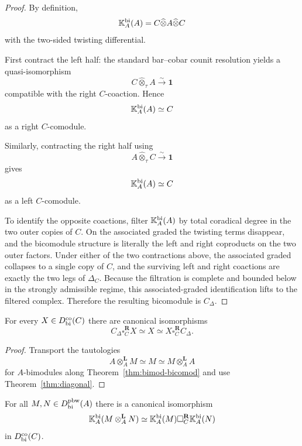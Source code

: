 \begin{proof}
By definition,
\[
\mathbb{K}_A^{\mathrm{bi}}(A)=C\widehat\otimes A\widehat\otimes C
\]
with the two-sided twisting differential.

First contract the left half:
the standard bar--cobar counit resolution yields a quasi-isomorphism
\[
C\widehat\otimes_\tau A\xrightarrow{\sim} \mathbf 1
\]
compatible with the right $C$-coaction. Hence
\[
\mathbb{K}_A^{\mathrm{bi}}(A)\simeq C
\]
as a right $C$-comodule.

Similarly, contracting the right half using
\[
A\widehat\otimes_\tau C\xrightarrow{\sim}\mathbf 1
\]
gives
\[
\mathbb{K}_A^{\mathrm{bi}}(A)\simeq C
\]
as a left $C$-comodule.

To identify the opposite coactions, filter $\mathbb{K}_A^{\mathrm{bi}}(A)$ by total coradical degree in the
two outer copies of $C$. On the associated graded the twisting terms disappear, and the bicomodule
structure is literally the left and right coproducts on the two outer factors. Under either of the
two contractions above, the associated graded collapses to a single copy of $C$, and the surviving
left and right coactions are exactly the two legs of $\Delta_C$. Because the filtration is complete
and bounded below in the strongly admissible regime, this associated-graded identification lifts to
the filtered complex. Therefore the resulting bicomodule is $C_\Delta$.
\end{proof}

\begin{corollary}
For every $X\in D^{\mathrm{co}}_{\mathrm{bi}}(C)$ there are canonical isomorphisms
\[
C_\Delta \square_C^{\mathbf R} X \simeq X \simeq X \square_C^{\mathbf R} C_\Delta.
\]
\end{corollary}

\begin{proof}
Transport the tautologies
\[
A\otimes_A^{\mathbf L} M\simeq M\simeq M\otimes_A^{\mathbf L} A
\]
for $A$-bimodules along Theorem~\ref{thm:bimod-bicomod} and use
Theorem~\ref{thm:diagonal}.
\end{proof}

\begin{corollary}
For all $M,N\in D^{\mathrm{pbw}}_{\mathrm{bi}}(A)$ there is a canonical isomorphism
\[
\mathbb{K}_A^{\mathrm{bi}}(M\otimes_A^{\mathbf L} N)
\simeq
\mathbb{K}_A^{\mathrm{bi}}(M)\square_C^{\mathbf R}\mathbb{K}_A^{\mathrm{bi}}(N)
\]
in $D^{\mathrm{co}}_{\mathrm{bi}}(C)$.
\end{corollary}

